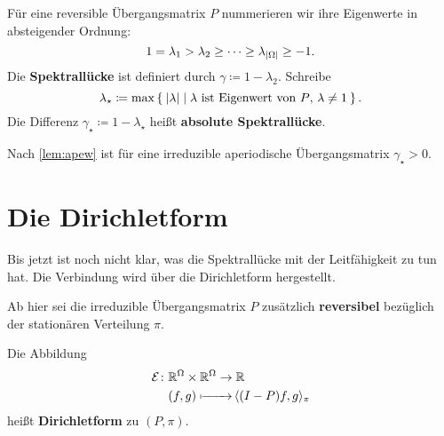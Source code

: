 \documentclass[ngerman,a4paper,11pt]{scrartcl}
\newcommand{\diri}{\mathcal{E}}
\newcommand{\RR}{\mathbb{R}}
\DeclarePairedDelimiter{\sprod}{\langle}{\rangle}	%
\DeclarePairedDelimiter{\abs}{\lvert}{\rvert}		%
\newcommand\phantomarrow[2]{%
  \setbox0=\hbox{$\displaystyle #1\to$}%
  \hbox to \wd0{%
    $#2\mapstochar
     \cleaders\hbox{$\mkern-1mu\relbar\mkern-3mu$}\hfill
     \mkern-7mu\rightarrow$}%
  \,}
\begin{document}
\begin{defn}
 Für eine reversible Übergangsmatrix $P$ nummerieren wir ihre Eigenwerte in
 absteigender Ordnung:
 \begin{equation*}
  1=\lambda_1>\lambda_2\geq\dotsb\geq\lambda_{\abs{\Omega}}\geq -1.
 \end{equation*}
 Die \textbf{Spektrallücke} ist definiert durch $\gamma\coloneqq 1-\lambda_2$.
 Schreibe
 \begin{equation*}
  \lambda_\star\coloneqq\max\Set{\abs{\lambda}\mid\text{$\lambda$ ist Eigenwert von $P$, $\lambda\neq 1$}}. 
 \end{equation*}
  Die Differenz $\gamma_\star\coloneqq 1-\lambda_\star$ heißt \textbf{absolute Spektrallücke}.
\end{defn}

\begin{rem}
 Nach \cref{lem:apew} ist für eine irreduzible aperiodische Übergangsmatrix $\gamma_\star>0$. 
\end{rem}

\section{Die Dirichletform}
Bis jetzt ist noch nicht klar, was die Spektrallücke mit der Leitfähigkeit zu
tun hat. Die Verbindung wird über die Dirichletform hergestellt.

Ab hier sei die irreduzible Übergangsmatrix $P$ zusätzlich \textbf{reversibel} bezüglich der
stationären Verteilung $\pi$.

\begin{defn}
  Die Abbildung
  \begin{align*}
   \diri \colon &\RR^\Omega\times\RR^\Omega \to\RR \\
   &\phantomarrow{\RR^\Omega\times\RR^\Omega}{(f,g)}\sprod{(I-P)f,g}_\pi
  \end{align*}
  heißt \textbf{Dirichletform} zu $(P,\pi)$.
\end{defn}
\end{document}
